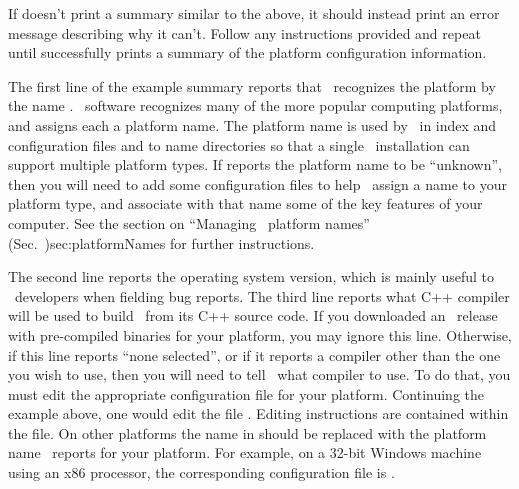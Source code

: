 If  doesn't print a summary similar to the
above, it should instead print an error message describing why it can't.
Follow any instructions provided
and repeat until  successfully prints a summary
of the platform configuration information.

The first line of the example summary reports that \OOMMF\ recognizes
the platform by the name .  \OOMMF\ software recognizes many
of the more popular computing platforms, and assigns each a platform
name.  The platform name is used by \OOMMF\ in index and configuration
files and to name directories so that a single \OOMMF\ installation can
support multiple platform types.  If  reports
the platform name to be ``unknown'', then you will need to add some
configuration files to help \OOMMF\ assign a name to your platform type,
and associate with that name some of the key features of your computer.
See the section on
{``Managing \OOMMF\ platform names'' (Sec.~}{)}{sec:platformNames}
for further instructions.

The second line reports the operating system version, which is mainly
useful to \OOMMF\ developers when fielding bug reports.  The third line
reports what C++ compiler will be used to build \OOMMF\ from its C++
source code.  If you downloaded an \OOMMF\ release with pre-compiled
binaries for your platform, you may ignore this line.  Otherwise, if
this line reports ``none selected'', or if it reports a compiler other
than the one you wish to use, then you will need to tell \OOMMF\ what
compiler to use.  To do that, you must edit the appropriate
configuration file for your platform.  Continuing the example above, one
would edit the file
.
Editing instructions are contained within the file.  On other platforms
the name  in 
should be replaced with the platform name \OOMMF\ reports for your
platform.  For example, on a 32-bit Windows machine using an x86
processor, the corresponding configuration file is
.

